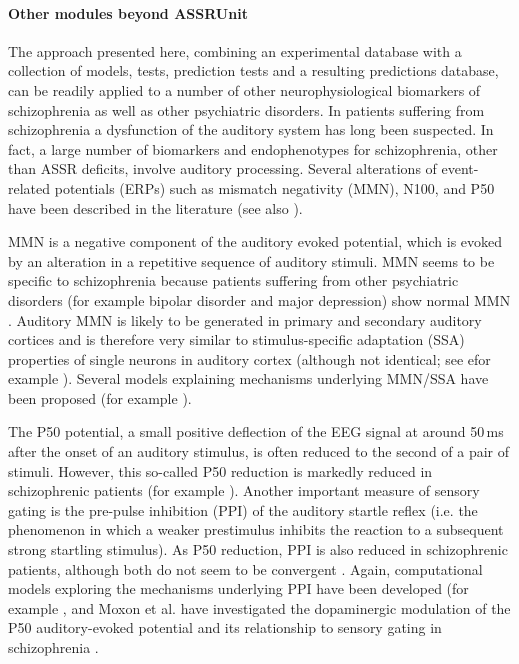 \documentclass[a4paper,10pt]{article}
\begin{document}
\paragraph{Other modules beyond ASSRUnit}
The approach presented here, combining an experimental database with a collection of models, tests, prediction tests and a resulting predictions database, can be readily applied 
to a number of other neurophysiological biomarkers of schizophrenia as well as other psychiatric disorders. 
In patients suffering from schizophrenia a dysfunction of the auditory system has long been suspected. In fact, a large number of biomarkers and endophenotypes for schizophrenia, other
than ASSR deficits, involve auditory processing. Several alterations of event-related potentials (ERPs) such as mismatch negativity (MMN), N100, and P50 have been described in the literature 
(see also \cite{Siekmeier2015,Shi2007}).

MMN is a negative component of the auditory evoked potential, which is evoked by an alteration in a repetitive sequence of auditory stimuli. MMN
seems to be specific to schizophrenia because patients suffering from other psychiatric disorders (for example bipolar disorder and major depression) show normal MMN \cite{Umbricht2003}. 
Auditory MMN is likely to be generated in primary and secondary auditory cortices and is therefore very similar  
to stimulus-specific adaptation (SSA) properties of single neurons in auditory cortex \cite{Nelken2007} (although not identical; see efor example \cite{Farley2010,vonderBehrens2009}).
Several models explaining mechanisms underlying MMN/SSA have been proposed (for example \cite{Mill2011,Nelken2014}).  

The P50 potential, a small positive deflection of the EEG signal at around 50\,ms after the onset of an auditory stimulus, is often reduced to the second of a pair of stimuli.
However, this so-called P50 reduction is markedly reduced in schizophrenic patients (for example \cite{Braff2007}). Another important measure of sensory gating is the pre-pulse inhibition (PPI) of
the auditory startle reflex (i.e. the phenomenon in which a weaker prestimulus inhibits the reaction to a subsequent strong startling stimulus). As P50 reduction, PPI is also reduced in schizophrenic patients,
although both do not seem to be convergent \cite{Braff2007}. Again, computational models exploring the mechanisms underlying PPI have been developed (for example \cite{Schmajuk2005,Ramirez2012,Leumann2001}, and Moxon et al.
have investigated the dopaminergic modulation of the P50 auditory-evoked potential and its relationship to sensory gating in schizophrenia \cite{Moxon2003}.
 
\end{document}
